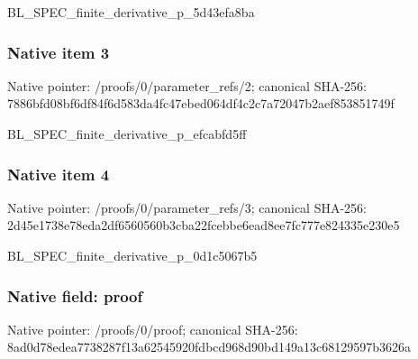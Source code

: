 \documentclass[10pt,a4paper]{article}
\begin{document}
\begingroup\raggedright\sloppy BL\_\allowbreak{}SPEC\_\allowbreak{}finite\_\allowbreak{}derivative\_\allowbreak{}p\_\allowbreak{}5d43efa8ba\par\endgroup

\subsubsection{Native item 3}
Native pointer: /proofs/0/parameter\_\allowbreak{}refs/2; canonical SHA-256: 7886bfd08bf6df84f6d583da4fc47ebed064df4c2c7a72047b2aef853851749f

\begingroup\raggedright\sloppy BL\_\allowbreak{}SPEC\_\allowbreak{}finite\_\allowbreak{}derivative\_\allowbreak{}p\_\allowbreak{}efcabfd5ff\par\endgroup

\subsubsection{Native item 4}
Native pointer: /proofs/0/parameter\_\allowbreak{}refs/3; canonical SHA-256: 2d45e1738e78eda2df6560560b3cba22fcebbe6ead8ee7fc777e824335e230e5

\begingroup\raggedright\sloppy BL\_\allowbreak{}SPEC\_\allowbreak{}finite\_\allowbreak{}derivative\_\allowbreak{}p\_\allowbreak{}0d1c5067b5\par\endgroup

\subsubsection{Native field: proof}
Native pointer: /proofs/0/proof; canonical SHA-256: 8ad0d78edea7738287f13a62545920fdbcd968d90bd149a13c68129597b3626a
\end{document}
